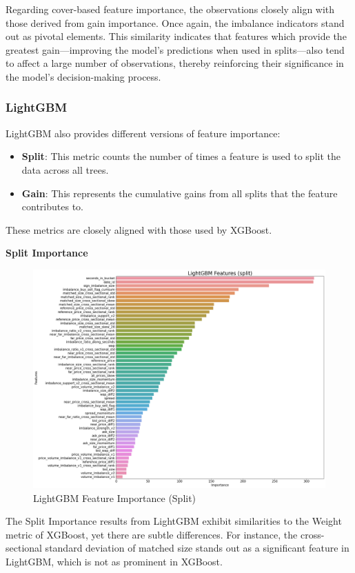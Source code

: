 \documentclass[12pt]{article}
\newtheorem{Proof of Lemma}{Proof of Lemma}
\begin{document}
Regarding cover-based feature importance, the observations closely align with those derived from gain importance. Once again, the imbalance indicators stand out as pivotal elements. This similarity indicates that features which provide the greatest gain—improving the model's predictions when used in splits—also tend to affect a large number of observations, thereby reinforcing their significance in the model's decision-making process.

\subsubsection*{LightGBM}

LightGBM also provides different versions of feature importance:

\begin{itemize}
  \item \textbf{Split}: This metric counts the number of times a feature is used to split the data across all trees.
  \item \textbf{Gain}: This represents the cumulative gains from all splits that the feature contributes to. 
\end{itemize}

These metrics are closely aligned with those used by XGBoost.

\noindent \textbf{Split Importance}
\begin{figure}[H]
  \centering
  \includegraphics[width=1\linewidth]{images/lgb_split.png}
  \caption{LightGBM Feature Importance (Split)}
  \label{fig:lgb_split}
\end{figure}
The Split Importance results from LightGBM exhibit similarities to the Weight metric of XGBoost, yet there are subtle differences. For instance, the cross-sectional standard deviation of matched size stands out as a significant feature in LightGBM, which is not as prominent in XGBoost.
\end{document}
